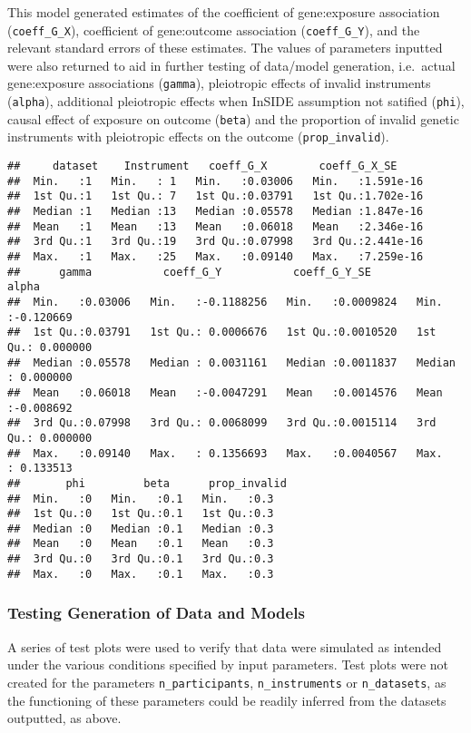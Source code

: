 \documentclass[
]{article}
\begin{document}
This model generated estimates of the coefficient of gene:exposure
association (\texttt{coeff\_G\_X}), coefficient of gene:outcome
association (\texttt{coeff\_G\_Y}), and the relevant standard errors of
these estimates. The values of parameters inputted were also returned to
aid in further testing of data/model generation, i.e.~actual
gene:exposure associations (\texttt{gamma}), pleiotropic effects of
invalid instruments (\texttt{alpha}), additional pleiotropic effects
when InSIDE assumption not satified (\texttt{phi}), causal effect of
exposure on outcome (\texttt{beta}) and the proportion of invalid
genetic instruments with pleiotropic effects on the outcome
(\texttt{prop\_invalid}).

\begin{verbatim}
##     dataset    Instrument   coeff_G_X        coeff_G_X_SE      
##  Min.   :1   Min.   : 1   Min.   :0.03006   Min.   :1.591e-16  
##  1st Qu.:1   1st Qu.: 7   1st Qu.:0.03791   1st Qu.:1.702e-16  
##  Median :1   Median :13   Median :0.05578   Median :1.847e-16  
##  Mean   :1   Mean   :13   Mean   :0.06018   Mean   :2.346e-16  
##  3rd Qu.:1   3rd Qu.:19   3rd Qu.:0.07998   3rd Qu.:2.441e-16  
##  Max.   :1   Max.   :25   Max.   :0.09140   Max.   :7.259e-16  
##      gamma           coeff_G_Y           coeff_G_Y_SE           alpha          
##  Min.   :0.03006   Min.   :-0.1188256   Min.   :0.0009824   Min.   :-0.120669  
##  1st Qu.:0.03791   1st Qu.: 0.0006676   1st Qu.:0.0010520   1st Qu.: 0.000000  
##  Median :0.05578   Median : 0.0031161   Median :0.0011837   Median : 0.000000  
##  Mean   :0.06018   Mean   :-0.0047291   Mean   :0.0014576   Mean   :-0.008692  
##  3rd Qu.:0.07998   3rd Qu.: 0.0068099   3rd Qu.:0.0015114   3rd Qu.: 0.000000  
##  Max.   :0.09140   Max.   : 0.1356693   Max.   :0.0040567   Max.   : 0.133513  
##       phi         beta      prop_invalid
##  Min.   :0   Min.   :0.1   Min.   :0.3  
##  1st Qu.:0   1st Qu.:0.1   1st Qu.:0.3  
##  Median :0   Median :0.1   Median :0.3  
##  Mean   :0   Mean   :0.1   Mean   :0.3  
##  3rd Qu.:0   3rd Qu.:0.1   3rd Qu.:0.3  
##  Max.   :0   Max.   :0.1   Max.   :0.3
\end{verbatim}

\subsubsection{Testing Generation of Data and
Models}\label{testing-generation-of-data-and-models}

A series of test plots were used to verify that data were simulated as
intended under the various conditions specified by input parameters.
Test plots were not created for the parameters \texttt{n\_participants},
\texttt{n\_instruments} or \texttt{n\_datasets}, as the functioning of
these parameters could be readily inferred from the datasets outputted,
as above.
\end{document}
